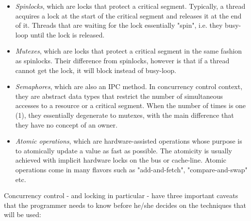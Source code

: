 \begin{itemize}
	\item \textit{Spinlocks}, which are locks that protect a critical segment.  
		Typically, a thread acquires a lock at the start of the critical 
		segment and releases it at the end of it. Threads that are waiting for 
		the lock essentially "spin", i.e. they busy-loop until the lock is 
		released.
	\item \textit{Mutexes}, which are locks that protect a critical segment in 
		the same fashion as spinlocks. Their difference from spinlocks, however 
		is that if a thread cannot get the lock, it will block instead of 
		busy-loop.
	\item \textit{Semaphores}, which are also an IPC method. In concurrency 
		control context, they are abstract data types that restrict the 
		number of simultaneous accesses to a resource or a critical 
		segment.  When the number of times is one (1), they essentially 
		degenerate to mutexes, with the main difference that they have 
		no concept of an owner.
	\item \textit{Atomic operations}, which are hardware-assisted 
		operations whose purpose is to atomically update a value as 
		fast as possible. The atomicity is usually achieved with 
		implicit hardware locks on the bus or cache-line.  Atomic 
		operations come in many flavors such as "add-and-fetch", 
		"compare-and-swap" etc.
\end{itemize}

Concurrency control - and locking in particular - have three important caveats 
that the programmer needs to know before he/she decides on the techniques that 
will be used:

